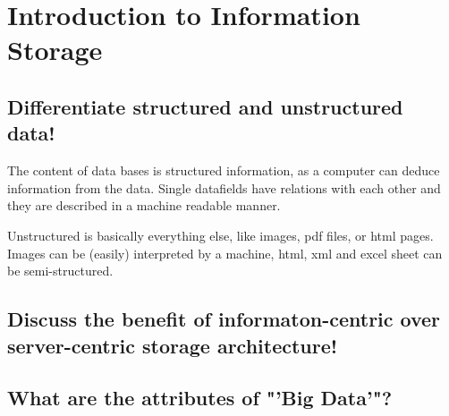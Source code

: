 \section{Introduction to Information Storage} %
\label{sec:introduction_to_information_storage}

\subsection{Differentiate structured and unstructured data!} %
\label{sub:differentiate_structured_and_unstructured_data_}
	The content of data bases is structured information,
	as a computer can deduce information from the data.
	Single datafields have relations with each other
	and they are described in a machine readable manner.

	Unstructured is basically everything else,
	like images, pdf files, or html pages.
	Images can be (easily) interpreted by a machine,
	html, xml and excel sheet can be semi-structured.


\subsection{Discuss the benefit of informaton-centric over server-centric storage architecture!} %
\label{sub:discuss_the_benefit_of_informaton_centric_over_server_centric_storage_architecture_}


\subsection{What are the attributes of "'Big Data'"?} %
\label{sub:what_are_the_attributes_of_big_data}



